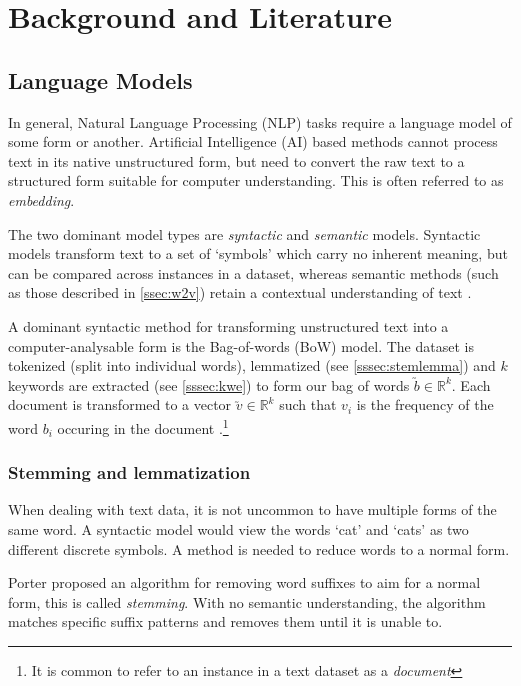 \section{Background and Literature}\label{sec:lit}

\subsection{Language Models}\label{ssec:kwe}
In general, Natural Language Processing (NLP) tasks require a language model of some form or another.
Artificial Intelligence (AI) based methods cannot process text in its native unstructured form, but need to convert the
raw text to a structured form suitable for computer understanding. This is often referred to as \emph{embedding}.

The two dominant model types are \emph{syntactic} and \emph{semantic} models. 
Syntactic models transform text to a set of `symbols' which carry no inherent meaning, but can be 
compared across instances in a dataset, whereas semantic methods (such as those described in \autoref{ssec:w2v})
retain a contextual understanding of text \cite{Cambria2014}.

A dominant syntactic method for transforming unstructured text into a computer-analysable form is the Bag-of-words 
(BoW) model. 
The dataset is tokenized (split into individual words), lemmatized (see \autoref{sssec:stemlemma})
and $k$ keywords are extracted (see \autoref{sssec:kwe}) to form our bag of words $\utilde{b}\in \mathbb{R} ^{k}$.
Each document is
transformed to a vector $\utilde{v}\in \mathbb{R} ^{k}$ such that $v_i$ is the frequency 
of the word $b_i$ occuring in the document \cite{Cambria2014, StevenBirdEwanKlein2009, Zhang2010}.\footnote{It is common to refer to an instance in a text dataset as a \emph{document}}

\subsubsection{Stemming and lemmatization}\label{sssec:stemlemma}
When dealing with text data, it is not uncommon to have multiple forms of the same word.  A syntactic model would view
the words `cat' and `cats' as two different discrete symbols.  A method is needed to reduce words to a normal form.

Porter \cite{Porter1980} proposed an algorithm for removing word suffixes to aim for a normal form, this is called
\emph{stemming}. With no semantic understanding, the algorithm matches specific suffix patterns and removes them
until it is unable to.

